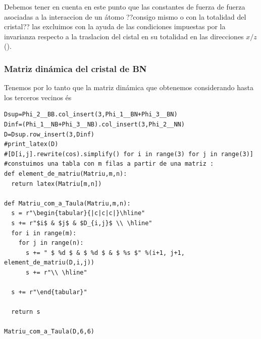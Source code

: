 \documentclass[12pt,a4paper]{article}
\begin{document}
Debemos tener en cuenta en este punto que las  constantes de fuerza de fuerza asociadas a la interaccion de un átomo \color{red}??consigo mismo o con la totalidad del cristal?? \normalcolor las excluimos con la ayuda de las condiciones impuestas por la invarianza respecto a la traslacion del cistal en su totalidad en las direcciones \(x/z\) (\cite{falkovsky08_symmet_const_phonon_disper_graph}).


\eject \pdfpagewidth=410mm \pdfpageheight=310mm
\subsubsection{Matriz dinámica del cristal de BN}
\label{sec:orga6a8d66}

Tenemos por lo tanto que la matriz dinámica que obtenemos considerando hasta los terceros vecinos és
\begin{verbatim}
Dsup=Phi_2__BB.col_insert(3,Phi_1__BN+Phi_3__BN)
Dinf=(Phi_1__NB+Phi_3__NB).col_insert(3,Phi_2__NN)
D=Dsup.row_insert(3,Dinf)
#print_latex(D)
#[D[i,j].rewrite(cos).simplify() for i in range(3) for j in range(3)]
#constuimos una tabla con m filas a partir de una matriz :
def element_de_matriu(Matriu,m,n):
  return latex(Matriu[m,n])

def Matriu_com_a_Taula(Matriu,m,n):
  s = r"\begin{tabular}{|c|c|c|}\hline"
  s += r"$i$ & $j$ & $D_{i,j}$ \\ \hline"
  for i in range(m):
    for j in range(n):
      s += " $ %d $ & $ %d $ & $ %s $" %(i+1, j+1, element_de_matriu(D,i,j))
      s += r"\\ \hline"

  s += r"\end{tabular}"

  return s

Matriu_com_a_Taula(D,6,6)
\end{verbatim}
\end{document}
